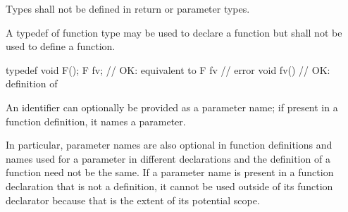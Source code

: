 \pnum
Types shall not be defined in return or parameter types.

\pnum
{}%
A typedef of function type may be used to declare a function but shall not be
used to define a function.
\begin{example}
\begin{codeblock}
typedef void F();
F  fv;              // OK: equivalent to 
F  fv { }           // error
void fv() { }       // OK: definition of 
\end{codeblock}
\end{example}

\pnum
An identifier can optionally be provided as a parameter name;
if present in a function definition, it names a parameter.
\begin{note}
In particular, parameter names are also optional in function definitions
and names used for a parameter in different declarations and the definition
of a function need not be the same.
If a parameter name is present in a function declaration that is not a definition,
it cannot be used outside of
its function declarator because that is the extent of its potential scope.
\end{note}

